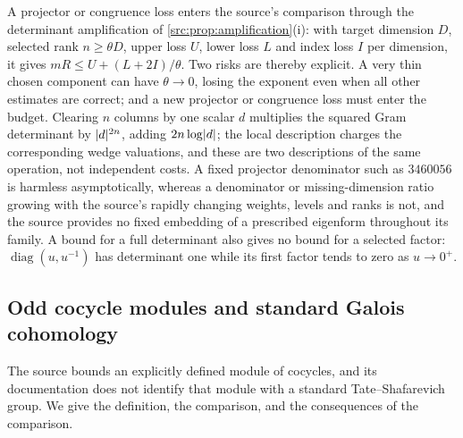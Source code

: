 A projector or congruence loss enters the source's comparison through the
determinant amplification of \cref{src:prop:amplification}(i): with target
dimension $D$, selected rank $n\ge\theta D$, upper loss $U$, lower loss $L$
and index loss $I$ per dimension, it gives $mR\le U+(L+2I)/\theta$. Two
risks are thereby explicit. A very thin chosen component can have
$\theta\to0$, losing the exponent even when all other estimates are
correct; and a new projector or congruence loss must enter the budget.
Clearing $n$ columns by one scalar $d$ multiplies the squared Gram
determinant by $\lvert d\rvert^{2n}$, adding $2n\log\lvert d\rvert$; the local
description charges the corresponding wedge valuations, and these are two
descriptions of the same operation, not independent costs. A fixed
projector denominator such as $3460056$ is harmless asymptotically, whereas
a denominator or missing-dimension ratio growing with the source's rapidly
changing weights, levels and ranks is not, and the source provides no fixed
embedding of a prescribed eigenform throughout its family. A bound for a
full determinant also gives no bound for a selected factor:
$\operatorname{diag}(u,u^{-1})$ has determinant one while its first factor
tends to zero as $u\to0^+$.

\subsection{Odd cocycle modules and standard Galois cohomology}\label{sel:sec:oddsha}

The source bounds an explicitly defined module of cocycles, and its
documentation does not identify that module with a standard
Tate--Shafarevich group. We give the definition, the comparison, and the
consequences of the comparison.

